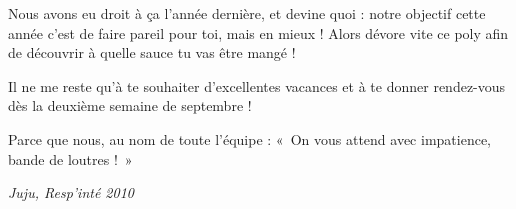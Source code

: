 Nous avons eu droit à ça l'année dernière, et devine quoi : notre objectif
cette année c'est de faire pareil pour toi, mais en mieux ! Alors dévore vite ce poly afin
de découvrir à quelle sauce tu vas être mangé !

\vspace{1em}

Il ne me reste qu'à te souhaiter d'excellentes vacances et à te donner
rendez-vous dès la deuxième semaine de septembre !

\vspace{1em}

Parce que nous, au nom de toute l'équipe : «~On vous attend avec impatience, bande
de loutres !~»
\vspace{1cm}
\begin{flushright}
\emph{Juju, Resp'inté 2010}
\end{flushright}
\newpage
